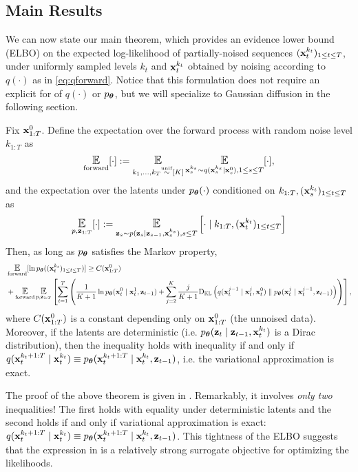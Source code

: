 \subsection{Main Results}
We can now state our main theorem, which provides an evidence lower bound (ELBO) on the expected log-likelihood of partially-noised sequences $(\mathbf{x}_{t}^{k_t})_{1 \le t \le T}$, under uniformly sampled levels $k_t$ and $\mathbf{x}_t^{k_t}$ obtained by noising according to $q(\cdot)$ as in \eqref{eq:qforward}. Notice that this formulation does not require an explicit for of $q(\cdot)$ or $p_{\bm{\theta}}$, but we will specialize to Gaussian diffusion in the following section. 
\newcommand{\mutheta}{\mu_{\bm{\theta}}}
\begin{theorem}\label{thm:main_elbo}  Fix $\mathbf{x}_{1:T}^{0}$. Define the expectation over the forward process with random noise level $k_{1:T}$ as 
\begin{align}
\Eforward[\cdot] := \Exp_{k_{1},\dots,k_T \unifsim [K]}\Exp_{\bx_{s}^{k_s}\sim q(\bx_{s}^{k_s} \mid \bx_s^0),1 \le s \le T}[\cdot],
\end{align}
and the expectation over the latents under $p_{\bm{\theta}}(\cdot)$ conditioned on $k_{1:T},(\mathbf{x}_{s}^{k_t})_{1 \le t \le T}$ as 
\begin{align}
\Epz[\cdot] := \Exp_{\bz_{s} \sim p (\bz_{s} \mid \bz_{s-1},\bx_s^{k_s}), s\le T}\left[\cdot \mid k_{1:T}, (\bx_t^{k_t})_{1 \le t \le T}\right]
\end{align}
 Then, as long as $p_{\bm{\theta}}$ satisfies the Markov property, 
\begin{align*}
&\Eforward[\ln  \ptheta((\bx_{t}^{k_t})_{1 \le t \le T})] \ge C(\bx_{1:T}^0)  \\
&+ \Eforward\Epz \left[\sum_{t=1}^T \left(\frac{1}{K+1}\ln \ptheta(\bx_t^{0} \mid \bx_{t}^{1},  \bz_{t-1}) +  \sum_{j=2}^{K}\frac{j}{K+1}\Dkl\left(q(\bx_{t}^{j-1} \mid \bx_t^{j},\bx_t^0) \parallel \ptheta(\bx_{t}^{j} \mid \bx_{t}^{j-1}, \bz_{t-1})\right)\right)\right], 
\end{align*}
 where $C(\mathbf{x}_{1:T}^0)$ is a constant depending only on $\mathbf{x}_{1:T}^0$ (the unnoised data). Moreover, if the latents are deterministic (i.e. $p_{\bm{\theta}}(\mathbf{z}_t \mid \mathbf{z}_{t-1},\mathbf{x}_t^{k_t})$ is a Dirac distribution),  then the inequality holds with inequality if and only if $q(\mathbf{x}_{t}^{k_t+1:T} \mid \mathbf{x}_t^{k_t}) \equiv p_{\bm{\theta}}(\mathbf{x}_{t}^{k_t+1:T} \mid \mathbf{x}_t^{k_t},\mathbf{z}_{t-1})$, i.e. the variational approximation is exact. 
\end{theorem}
The proof of the above theorem is given in . Remarkably, it involves \emph{only two} inequalities! The first holds with equality under deterministic latents and the second holds if and only if variational approximation is exact: $q(\mathbf{x}_{t}^{k_t+1:T} \mid \mathbf{x}_t^{k_t}) \equiv p_{\bm{\theta}}(\mathbf{x}_{t}^{k_t+1:T} \mid \mathbf{x}_t^{k_t},\mathbf{z}_{t-1})$. This tightness of the ELBO suggests that the expression in  is a relatively strong surrogate objective for optimizing the likelihoods. 


